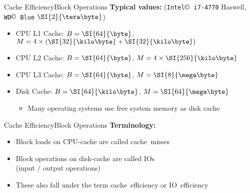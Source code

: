 
\begin{frame}{Cache Efficiency}{Block Operations}
  \textbf{Typical values:}
  (\texttt{Intel$\copyright$ i7-4770} Haswell,
  \texttt{WD$\copyright$ Blue} $\SI{2}{\tera\byte}$)
  \begin{itemize}
    \item
      CPU L1 Cache: $B = \SI{64}{\byte}$,
      $M = 4 \times (\SI{32}{\kilo\byte} + \SI{32}{\kilo\byte})$
    \item
      CPU L2 Cache: $B = \SI{64}{\byte}$, $M = 4 \times \SI{256}{\kilo\byte}$
    \item
      CPU L3 Cache: $B = \SI{64}{\byte}$, $M = \SI{8}{\mega\byte}$
    \item
      Disk Cache: $B = \SI{64}{\kilo\byte}$, $M = \SI{64}{\mega\byte}$
    \begin{itemize}
      \item
        Many operating systems use free system memory as disk cache
    \end{itemize}
  \end{itemize}
\end{frame}


\begin{frame}{Cache Efficiency}{Block Operations}
  \textbf{Terminology:}
  \begin{itemize}
    \item
      Block loads on CPU-cache are called {\color{Mittel-Blau}cache~misses}
    \item
      Block operations on disk-cache are called {\color{Mittel-Blau}IOs}\\
      (input / output operations)
    \item
      These also fall under the term {\color{Mittel-Blau}cache~efficiency} or
      {\color{Mittel-Blau}IO~efficiency}
  \end{itemize}
\end{frame}


